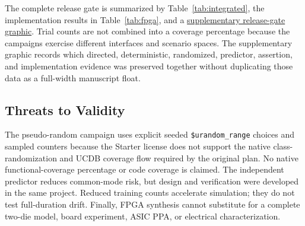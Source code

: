 The complete release gate is summarized by Table~\ref{tab:integrated}, the
implementation results in Table~\ref{tab:fpga}, and a
\href{https://github.com/Varadain/ucie-ltsm/blob/feature/v1.0-integrated-training/journal/figures/svg/fig12_regression_evidence.svg}{supplementary release-gate graphic}.
Trial counts are not combined into a coverage percentage because the campaigns
exercise different interfaces and scenario spaces. The supplementary graphic
records which directed, deterministic, randomized, predictor, assertion, and
implementation evidence was preserved together without duplicating those data
as a full-width manuscript float.

\subsection{Threats to Validity}

The pseudo-random campaign uses explicit seeded \texttt{\$urandom\_range}
choices and sampled counters because the Starter license does not support the
native class-randomization and UCDB coverage flow required by the original
plan. No native functional-coverage percentage or code coverage is claimed.
The independent predictor reduces common-mode risk, but design and verification
were developed in the same project. Reduced training counts accelerate
simulation; they do not test full-duration drift. Finally, FPGA synthesis
cannot substitute for a complete two-die model, board experiment, ASIC PPA, or
electrical characterization.
